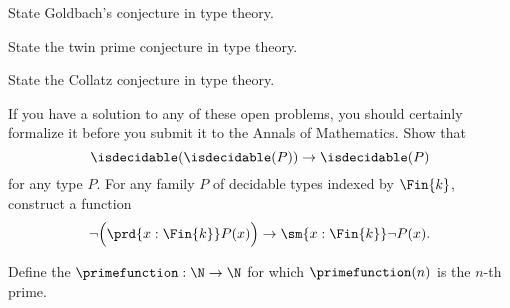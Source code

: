 \begin{exercises}
  \exitem
  \begin{subexenum}
  \item State Goldbach's conjecture in type theory.
  \item State the twin prime conjecture in type theory.
  \item State the Collatz conjecture in type theory.
  \end{subexenum}
  \noindent If you have a solution to any of these open problems, you should certainly formalize it before you submit it to the Annals of Mathematics.
  \exitem Show that
  \begin{equation*}
    \isdecidable(\isdecidable(P))\to\isdecidable(P)
  \end{equation*}
  for any type $P$.
  \exitem For any family $P$ of decidable types indexed by $\Fin{k}$, construct a function
  \begin{equation*}
    \neg\Big(\prd{x:\Fin{k}}P(x)\Big)\to\sm{x:\Fin{k}}\neg P(x).
  \end{equation*}
  \exitem
  \begin{subexenum}
  \item Define the  $\primefunction:\N\to\N$ for which $\primefunction(n)$ is the $n$-th prime.


\end{subexenum}
\end{exercises}
